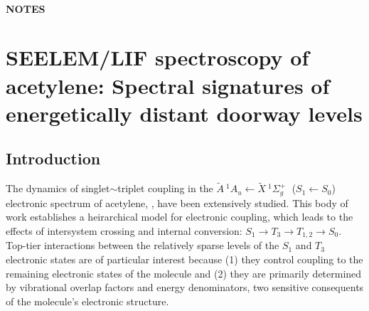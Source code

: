 \documentclass[12pt,draft]{mitthesis}
\newcommand{\bigspace}{$
  \;
  $}
\newcommand{\AtoX}{$
  \tilde{A} \: ^1\!A_u 
  \leftarrow 
  \tilde{X} \: ^1\Sigma_g^+
  $}
\newcommand{\StoS}{$
  S_1 \leftarrow S_0
  $}
\begin{document}
\tableofcontents
\clearpage

\subsubsection*{NOTES}

\clearpage

\setcounter{chapter}{3}
\chapter{SEELEM/LIF spectroscopy of acetylene: Spectral signatures of
  energetically distant doorway levels}

\section{Introduction}

The dynamics of singlet$\sim$triplet coupling in the \AtoX \bigspace
(\StoS) electronic spectrum of acetylene, , have been
extensively studied.  This body of work establishes a heirarchical
model for electronic coupling, which leads to the effects of
intersystem crossing and internal conversion: $S_1 \rightarrow T_3
\rightarrow T_{1,2} \rightarrow S_0$.  Top-tier interactions between
the relatively sparse levels of the $S_1$ and $T_3$ electronic states
are of particular interest because (1) they control coupling to the
remaining electronic states of the molecule and (2) they are primarily
determined by vibrational overlap factors and energy denominators, two
sensitive consequents of the molecule's electronic structure.

\end{document}
